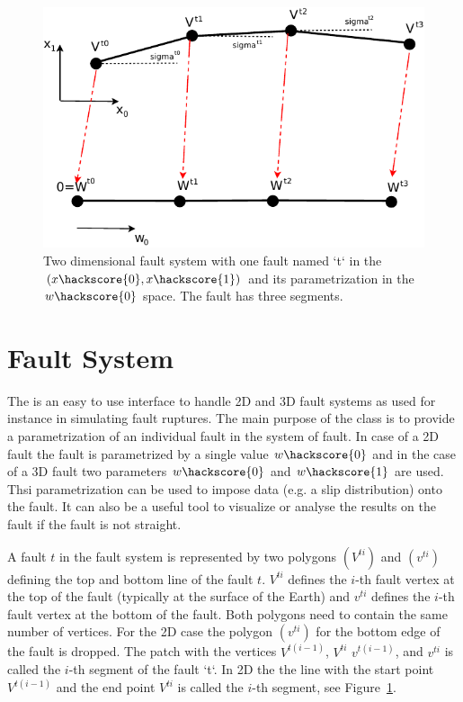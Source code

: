 \begin{figure}
\includegraphics[width=\textwidth]{figures/FaultSystem2D}
\caption{\label{FAULTSYSTEM2D}Two dimensional fault system with one fault named `t` in the $(x\hackscore{0},x\hackscore{1})$ and its parametrization in the
$w\hackscore{0}$ space. The fault has three segments.}
\end{figure}

\section{Fault System}
The  is an easy to use interface to handle 2D and 3D fault systems  as used for instance in simulating fault ruptures. The main purpose of the class is to provide a parametrization of an individual fault in the system of fault. In case of a 2D fault the fault is parametrized by a single value $w\hackscore{0}$ and in the case of a 3D fault two parameters $w\hackscore{0}$ and $w\hackscore{1}$ are used. Thsi parametrization can be used
to impose data (e.g. a slip distribution) onto the fault. It can also be a useful tool to visualize or analyse the results on the fault if the fault is not straight. 

A fault $t$ in the fault system is represented by two polygons $(V^{ti})$ and $(v^{ti})$
defining the top and bottom line of the fault $t$.
$V^{ti}$ defines the $i$-th fault vertex at the top of the fault (typically at the surface of the Earth) and
$v^{ti}$ defines the $i$-th fault vertex at the bottom of the fault. Both polygons need to contain the same number of 
vertices. For the 2D case the polygon $(v^{ti})$ for the bottom edge of the fault is dropped. 
The patch with the vertices 
$V^{t(i-1)}$, $V^{ti}$
$v^{t(i-1)}$, and $v^{ti}$
is called the $i$-th segment of the fault `t`. In 2D the the line with the start point $V^{t(i-1)}$ 
and the end point $V^{ti}$ is called the $i$-th segment, see Figure~\ref{FAULTSYSTEM2D}.

